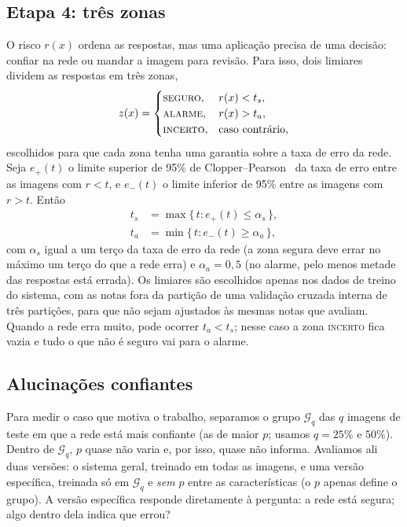 \subsection{Etapa 4: três zonas}
\label{sec:zonas}
O risco $r(x)$ ordena as respostas, mas uma aplicação precisa de uma decisão: confiar na rede ou mandar a imagem para revisão.
Para isso, dois limiares dividem as respostas em três zonas,
\begin{equation}
  z(x) = \begin{cases}
    \textsc{seguro},  & r(x) < t_s,\\
    \textsc{alarme},  & r(x) > t_a,\\
    \textsc{incerto}, & \text{caso contrário},
  \end{cases}
  \label{eq:zonas}
\end{equation}
escolhidos para que cada zona tenha uma garantia sobre a taxa de erro da rede. Seja $e_+(t)$ o limite superior de 95\% de
Clopper--Pearson~\cite{clopper1934} da taxa de erro entre as imagens com $r < t$, e $e_-(t)$ o limite inferior de 95\% entre as imagens
com $r > t$. Então
\begin{align}
  t_s &= \max\{\, t : e_+(t) \le \alpha_s \,\}, \nonumber\\
  t_a &= \min\{\, t : e_-(t) \ge \alpha_a \,\},
  \label{eq:limiares}
\end{align}
com $\alpha_s$ igual a um terço da taxa de erro da rede (a zona segura deve errar no máximo um terço do que a rede erra) e
$\alpha_a = 0{,}5$ (no alarme, pelo menos metade das respostas está errada). Os limiares são escolhidos apenas nos dados de treino do
sistema, com as notas fora da partição de uma validação cruzada interna de três partições, para que não sejam ajustados às mesmas
notas que avaliam. Quando a rede erra muito, pode ocorrer $t_a < t_s$; nesse caso a zona \textsc{incerto} fica vazia e tudo o que não é
seguro vai para o alarme.

\subsection{Alucinações confiantes}
\label{sec:confiantes}
Para medir o caso que motiva o trabalho, separamos o grupo $\mathcal{G}_q$ das $q$ imagens de teste em que a rede está mais confiante
(as de maior $p$; usamos $q = 25\%$ e $50\%$). Dentro de $\mathcal{G}_q$, $p$ quase não varia e, por isso, quase não informa. Avaliamos
ali duas versões: o sistema geral, treinado em todas as imagens, e uma versão específica, treinada só em $\mathcal{G}_q$ e
\emph{sem} $p$ entre as características (o $p$ apenas define o grupo). A versão específica responde diretamente à pergunta: a rede está
segura; algo dentro dela indica que errou?

